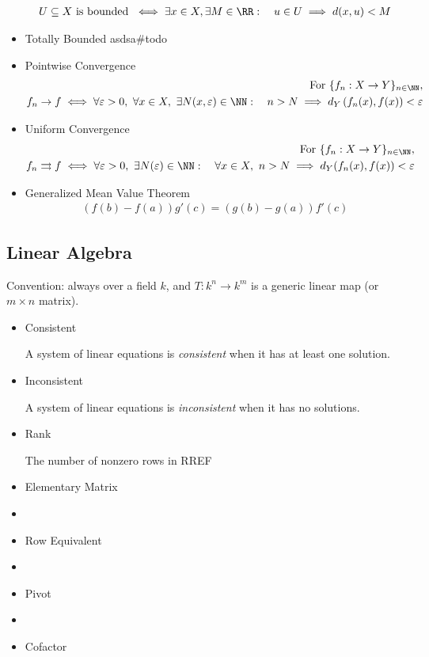 \begin{itemize}
\begin{align*}
  U \subseteq X \text{ is bounded } \iff \exists x\in X, \exists M \in \RR :\quad u\in U \implies d(x, u) < M
  \end{align*}
\item
  Totally Bounded asdsa\#todo
\item
  Pointwise Convergence
  \begin{align*}
  \text{For}~\{f_n: X \to Y\}_{n\in\NN},\\ f_n \to f \iff
  \forall \varepsilon > 0,~\forall x\in X,~ \exists N(x, \varepsilon)\in\NN :
  \quad n > N \implies d_Y\left(f_n(x),f(x)\right) < \varepsilon
  \end{align*}
\item
  Uniform Convergence
  \begin{align*}
  \text{For}~\{f_n: X \to Y\}_{n\in\NN}, \\
  f_n \rightrightarrows f \iff \forall \varepsilon > 0,~ \exists N(\varepsilon)\in\NN :
  \quad \forall x\in X,~ n > N \implies d_Y(f_n(x), f(x)) < \varepsilon
  \end{align*}
\item
  Generalized Mean Value Theorem
  \begin{align*}
  (f ( b ) - f ( a ) ) g' ( c ) = (g ( b ) - g ( a )) f' ( c )
  \end{align*}
\end{itemize}

\hypertarget{linear-algebra-1}{%
\subsection{Linear Algebra}\label{linear-algebra-1}}

Convention: always over a field \(k\), and \(T: k^n \to k^m\) is a
generic linear map (or \(m\times n\) matrix).

\begin{itemize}
\item
  Consistent

  A system of linear equations is \emph{consistent} when it has at least
  one solution.
\item
  Inconsistent

  A system of linear equations is \emph{inconsistent} when it has no
  solutions.
\item
  Rank

  The number of nonzero rows in RREF
\item
  Elementary Matrix
\item
\item
  Row Equivalent
\item
\item
  Pivot
\item
\item
  Cofactor
\end{itemize}

